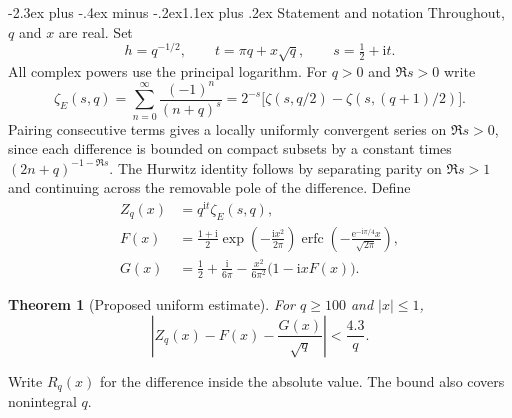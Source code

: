 \documentclass[11pt,a4paper]{article}
\makeatletter
\newtheorem{theorem}{Theorem}[section]
\newcommand{\ii}{\mathrm i}
\newcommand{\erfc}{\operatorname{erfc}}
\newcommand{\e}{\mathrm e}
\renewcommand\section{\@startsection{section}{1}{\z@}
  {-2.3ex plus -.4ex minus -.2ex}{1.1ex plus .2ex}
  {\normalfont\large\bfseries\centering}}
\makeatother
\begin{document}
\section{Statement and notation}
Throughout, $q$ and $x$ are real. Set
\begin{equation}\label{eq:parameters}
 h=q^{-1/2},\qquad t=\pi q+x\sqrt q,\qquad s=\tfrac12+\ii t .
\end{equation}
All complex powers use the principal logarithm. For $q>0$ and
$\Re s>0$ write
\begin{equation}\label{eq:zeta}
 \zeta_E(s,q)=\sum_{n=0}^\infty\frac{(-1)^n}{(n+q)^s}
 =2^{-s}\bigl[\zeta(s,q/2)-\zeta(s,(q+1)/2)\bigr].
\end{equation}
Pairing consecutive terms gives a locally uniformly convergent series
on $\Re s>0$, since each difference is bounded on compact subsets
by a constant times $(2n+q)^{-1-\Re s}$. The Hurwitz identity follows
by separating parity on $\Re s>1$ and continuing across the removable
pole of the difference. Define
\begin{align}
 Z_q(x)&=q^{\ii t}\zeta_E(s,q),\label{eq:Z}\\
 F(x)&=\frac{1+\ii}{2}\exp\!\left(-\frac{\ii x^2}{2\pi}\right)
 \erfc\!\left(-\frac{\e^{-\ii\pi/4}x}{\sqrt{2\pi}}\right),\label{eq:F}\\
 G(x)&=\frac12+\frac{\ii}{6\pi}
 -\frac{x^2}{6\pi^2}\bigl(1-\ii xF(x)\bigr).\label{eq:G}
\end{align}
\begin{theorem}[Proposed uniform estimate]\label{thm:main}
For $q\ge100$ and $|x|\le1$,
\begin{equation}\label{eq:main}
 \left|Z_q(x)-F(x)-\frac{G(x)}{\sqrt q}\right|<\frac{4.3}{q}.
\end{equation}
\end{theorem}
Write $R_q(x)$ for the difference inside the absolute value. The bound
also covers nonintegral $q$.
\end{document}
